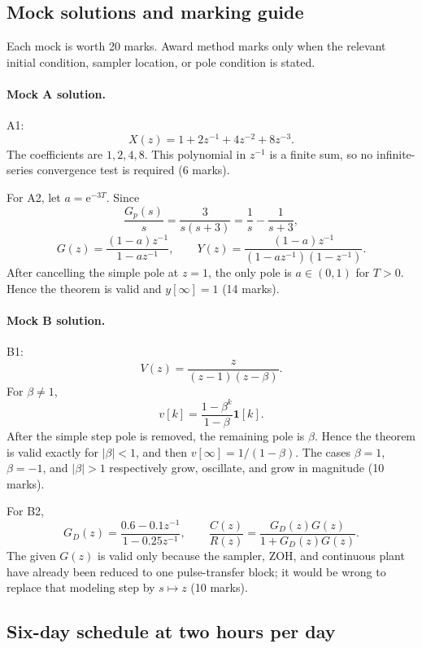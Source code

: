 \documentclass[11pt]{article}
\newcommand{\e}{\mathrm{e}}
\newcommand{\unitstep}{\mathbf{1}}
\begin{document}
\subsection{Mock solutions and marking guide}

Each mock is worth 20 marks.  Award method marks only when the relevant initial condition, sampler location, or pole condition is stated.

\paragraph{Mock A solution.}
A1:
\[
X(z)=1+2z^{-1}+4z^{-2}+8z^{-3}.
\]
The coefficients are $1,2,4,8$.  This polynomial in $z^{-1}$ is a finite sum, so no infinite-series convergence test is required (6 marks).

For A2, let $a=\e^{-3T}$.  Since
\[
\frac{G_p(s)}{s}=\frac{3}{s(s+3)}=\frac1s-\frac1{s+3},
\]
\[
G(z)=\frac{(1-a)z^{-1}}{1-az^{-1}},
\qquad
Y(z)=\frac{(1-a)z^{-1}}
{(1-az^{-1})(1-z^{-1})}.
\]
After cancelling the simple pole at $z=1$, the only pole is $a\in(0,1)$ for $T>0$.  Hence the theorem is valid and $y[\infty]=1$ (14 marks).

\paragraph{Mock B solution.}
B1:
\[
V(z)=\frac{z}{(z-1)(z-\beta)}.
\]
For $\beta\ne1$,
\[
v[k]=\frac{1-\beta^k}{1-\beta}\unitstep[k].
\]
After the simple step pole is removed, the remaining pole is $\beta$.  Hence the theorem is valid exactly for $|\beta|<1$, and then $v[\infty]=1/(1-\beta)$.  The cases $\beta=1$, $\beta=-1$, and $|\beta|>1$ respectively grow, oscillate, and grow in magnitude (10 marks).

For B2,
\[
G_D(z)=\frac{0.6-0.1z^{-1}}{1-0.25z^{-1}},
\qquad
\frac{C(z)}{R(z)}=
\frac{G_D(z)G(z)}{1+G_D(z)G(z)}.
\]
The given $G(z)$ is valid only because the sampler, ZOH, and continuous plant have already been reduced to one pulse-transfer block; it would be wrong to replace that modeling step by $s\mapsto z$ (10 marks).

\subsection{Six-day schedule at two hours per day}
\end{document}
